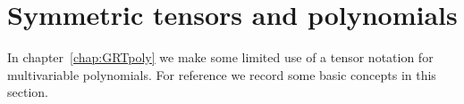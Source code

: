 

\section{Symmetric tensors and polynomials} \label{sec:tensors}
In chapter~\ref{chap:GRTpoly} we make some limited use of a tensor notation for multivariable polynomials. For reference we record some basic concepts in this section.

